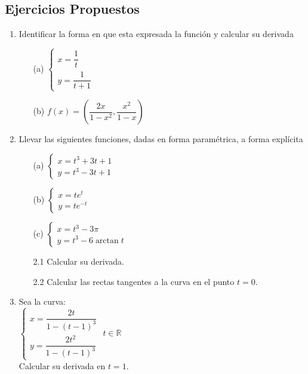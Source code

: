\documentclass[10pt,twoside]{SelfArx} %
\begin{document}
\subsection{Ejercicios Propuestos}
\begin{enumerate}
	\item 	Identificar la forma en que esta expresada la funci\'on y calcular su derivada
	\begin{enumerate}
		\item[(a)]	$ \begin{cases}
		x=\dfrac{1}{t}\\
		y=\dfrac{1}{t+1}
		\end{cases} $
		\item[(b)]	$ f(x)=\left (\dfrac{2x}{1-x^{2}},\dfrac{x^{2}}{1-x}\right  ) $

	\end{enumerate}


	\item 	Llevar las siguientes funciones, dadas en forma param\'etrica, a forma expl\'icita
	\begin{enumerate}
		\item[(a)]	$ \begin{cases}
			x=t^{3}+3t+1\\
			y=t^{3}-3t+1
		\end{cases} $
		\item[(b)]$ \begin{cases}
			x=te^{t}\\
			y=te^{-t}
			\end{cases} $
		\item[(c)]$ \begin{cases}
			x=t^{3}-3\pi\\
			y=t^{3}-6\arctan t
			\end{cases} $
	\end{enumerate}
	\begin{enumerate}
		\item[2.1]	Calcular su derivada.
		\item[2.2]	Calcular las rectas tangentes a la curva en el punto $ t=0 $.
	\end{enumerate}
	\item	Sea la curva:\\
	
	$ \begin{cases}
	x=\dfrac{2t}{1-(t-1)^{3}}\\
	y=\dfrac{2t^{2}}{1-(t-1)^{3}}
	\end{cases} $
	$ t\in\mathbb{R} $\\
	Calcular su derivada en $ t=1 $.
	

\end{enumerate}
\end{document}
